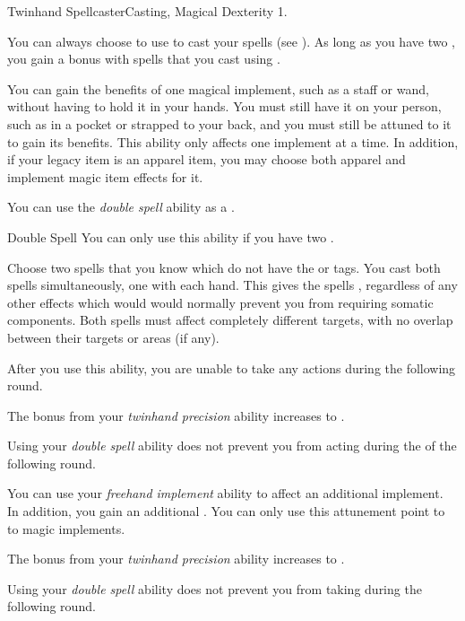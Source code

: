     \begin{feat}{Twinhand Spellcaster}{Casting, Magical}
        \featpre Dexterity 1.

         You can always choose to use  to cast your spells (see ).
        As long as you have two , you gain a   bonus with spells that you cast using .

         You can gain the benefits of one magical implement, such as a staff or wand, without having to hold it in your hands.
        You must still have it on your person, such as in a pocket or strapped to your back, and you must still be attuned to it to gain its benefits.
        This ability only affects one implement at a time.
        In addition, if your legacy item is an apparel item, you may choose both apparel and implement magic item effects for it.

         You can use the \textit{double spell} ability as a .
        \begin{instantability}{Double Spell}
            \rankline
            You can only use this ability if you have two .

            Choose two spells that you know which do not have the  or  tags.
            You cast both spells simultaneously, one with each hand.
            This gives the spells , regardless of any other effects which would would normally prevent you from requiring somatic components.
            Both spells must affect completely different targets, with no overlap between their targets or areas (if any).

            After you use this ability, you are unable to take any actions during the following round.
        \end{instantability}

         The bonus from your \textit{twinhand precision} ability increases to .

         Using your \textit{double spell} ability does not prevent you from acting during the  of the following round.

         You can use your \textit{freehand implement} ability to affect an additional implement.
        In addition, you gain an additional .
        You can only use this attunement point to  to magic implements.

         The bonus from your \textit{twinhand precision} ability increases to .

         Using your \textit{double spell} ability does not prevent you from taking  during the following round.
    \end{feat}

